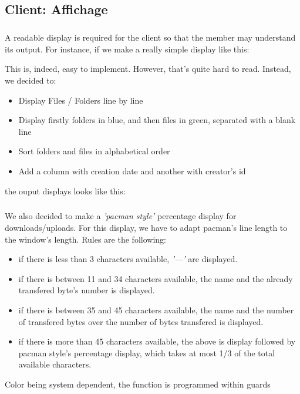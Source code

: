 \documentclass[12pt,a4paper,twoside]{article}
\begin{document}
		\subsection{Client: Affichage} %
			\subparagraph*{}
				A readable display is required for the client so that the member may understand its output. For instance, if we make a really simple display like this:
				
				This is, indeed, easy to implement. However, that's quite hard to read. Instead, we decided to:
				\begin{itemize}
					\item{} Display Files / Folders line by line
					\item{} Display firstly folders in blue, and then files in green, separated with a blank line
					\item{} Sort folders and files in alphabetical order
					\item{} Add a column with creation date and another with creator's id
				\end{itemize}
				the ouput displays looks like this:
				
			\subparagraph*{}
				We also decided to make a \textit{'pacman style'} percentage display for downloads/uploads. For this display, we have to adapt pacman's line length to the window's length. Rules are the following:
				\begin{itemize}
					 \item{} if there is less than 3 characters available, \textit{'—'} are displayed.
					 \item{} if there is between 11 and 34 characters available, the name and the already transfered byte's number is displayed.
					 \item{} if there is between 35 and 45 characters available, the name and the number of transfered bytes over the number of bytes transfered is displayed.
					 \item{} if there is more than 45 characters available, the above is display followed by pacman style's percentage display, which takes at most 1/3 of the total available characters.
				 \end{itemize}
				Color being system dependent, the function is programmed within guards
\end{document}
